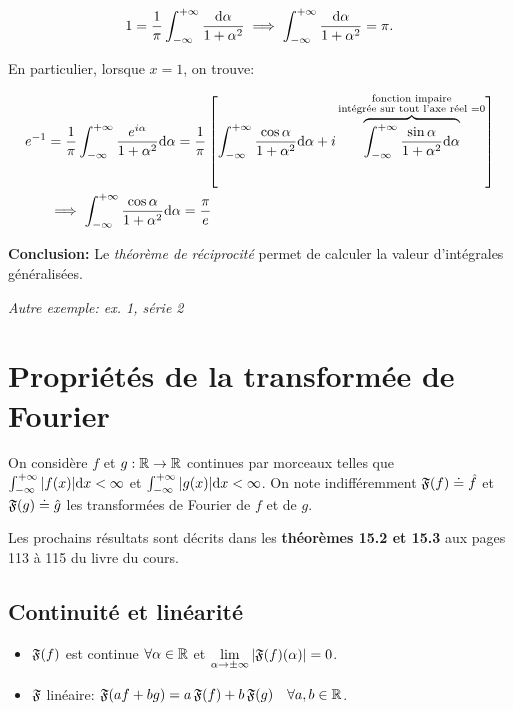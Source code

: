 \begin{example}
   \[1 = \frac{1}{\pi} \int_{-\infty}^{+\infty} \frac{\mathrm{d}\alpha}{1 + \alpha^2} \implies \int_{-\infty}^{+\infty} \frac{\mathrm{d}\alpha}{1 + \alpha^2} = \pi.
   \]
    
    En particulier, lorsque $x = 1$, on trouve:
    
    \begin{align*}
    e^{-1} &=
    \frac{1}{\pi} \int_{-\infty}^{+\infty} \frac{e^{i \alpha}}{1 + \alpha^2}\mathrm{d}\alpha =
    \frac{1}{\pi} \left[ \int_{-\infty}^{+\infty} \frac{\cos \alpha}{1 + \alpha^2} \mathrm{d}\alpha +
    i \overbrace{\int_{-\infty}^{+\infty} \frac{\sin \alpha}{1 + \alpha^2} \mathrm{d}\alpha}^{\substack{\textrm{fonction impaire} \\ \textrm{intégrée sur tout l'axe réel } = 0}} \right]
    \\&\implies
    \int_{-\infty}^{+\infty} \frac{\cos \alpha}{1 + \alpha^2} \mathrm{d}\alpha = \frac{\pi}{e}
    \end{align*}

\end{example}

\textbf{Conclusion:} Le \textit{théorème de réciprocité} permet de calculer la valeur d'intégrales généralisées.

\textit{Autre exemple: ex. 1, série 2}



\section{Propriétés de la transformée de Fourier}


On considère $f$ et $g: \mathbb{R} \rightarrow \mathbb{R}$ continues par morceaux telles que $\int_{-\infty}^{+\infty} |f(x)| \mathrm{d}x < \infty$ et $\int_{-\infty}^{+\infty} |g(x)| \mathrm{d}x < \infty$.
On note indifféremment $\mathfrak{F}(f) \doteq \hat{f}$ et $\mathfrak{F}(g) \doteq \hat{g}$ les transformées de Fourier de $f$ et de $g$.

\begin{note}
    Les prochains résultats sont décrits dans les \textbf{théorèmes 15.2 et 15.3} aux pages 113 à 115 du livre du cours.
\end{note}


\subsection{Continuité et linéarité}

\begin{itemize}
\item
$\mathfrak{F}(f)$ est continue $\forall \alpha \in \mathbb{R}$ et $\lim\limits_{\alpha \rightarrow \pm \infty} |\mathfrak{F}(f)(\alpha)| = 0$.
\item
$\mathfrak{F}$ linéaire: $\mathfrak{F}(af + bg) = a\,\mathfrak{F}(f) + b\,\mathfrak{F}(g) \quad \forall a,b \in \mathbb{R}$.
\end{itemize}


